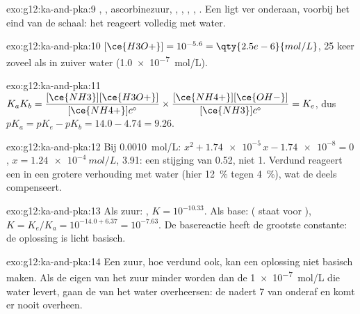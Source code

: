 \begin{solution}{exo:g12:ka-and-pka:9}
, , ascorbinezuur, , ,
, , . Een  ligt ver onderaan,
voorbij het eind van de schaal: het reageert volledig met water.
\end{solution}

\begin{solution}{exo:g12:ka-and-pka:10}
$[\ce{H3O+}] = 10^{-5.6} = \qty{2.5e-6}{mol/L}$, 25 keer zoveel als in
zuiver water (\qty{1.0e-7}{mol/L}).
\end{solution}

\begin{solution}{exo:g12:ka-and-pka:11}
$K_a K_b = \dfrac{[\ce{NH3}][\ce{H3O+}]}{[\ce{NH4+}]c^\circ} \times
\dfrac{[\ce{NH4+}][\ce{OH-}]}{[\ce{NH3}]c^\circ} = K_e$, dus
$pK_a = pK_e - pK_b = 14.0 - 4.74 = 9.26$.
\end{solution}

\begin{solution}{exo:g12:ka-and-pka:12}
Bij \qty{0.0010}{mol/L}: $x^2 + \num{1.74e-5}\,x - \num{1.74e-8} = 0$,
$x = \qty{1.24e-4}{mol/L}$,  3.91: een stijging van 0.52, niet 1.
Verdund reageert een  in een grotere verhouding met water (hier
\qty{12}{\percent} tegen \qty{4}{\percent}), wat de  deels
compenseert.
\end{solution}

\begin{solution}{exo:g12:ka-and-pka:13}
Als zuur: , $K = 10^{-10.33}$. Als
base:  ( staat voor ), $K = K_e/K_a = 10^{-14.0+6.37}
= 10^{-7.63}$. De basereactie heeft de grootste constante: de oplossing
is licht basisch.
\end{solution}

\begin{solution}{exo:g12:ka-and-pka:14}
Een zuur, hoe verdund ook, kan een oplossing niet basisch maken. Als de
eigen  van het zuur minder worden dan de \qty{1e-7}{mol/L}
die water levert, gaan de  van het water overheersen: de  nadert
7 van onderaf en komt er nooit overheen.
\end{solution}

